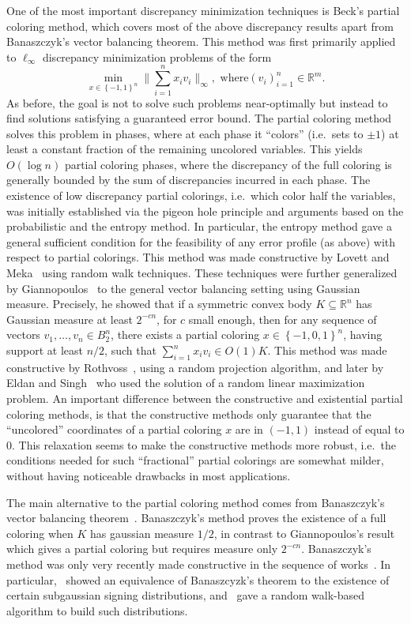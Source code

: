 \documentclass[11pt]{article}
\newcommand{\R}{{\mathbb{R}}}
\newcommand{\set}[1]{\left\{ #1 \right\}}
\begin{document}
One of the most important discrepancy minimization techniques is Beck's
partial coloring method, which covers most of the above discrepancy results
apart from Banaszczyk's vector balancing theorem. This method was first
primarily applied to $\ell_\infty$ discrepancy minimization problems of the form
\[
\min_{x \in \set{-1,1}^n} \Big\|\sum_{i=1}^n x_i v_i\Big\|_\infty, \text{ where
} (v_i)_{i=1}^n \in \R^m.
\]
As before, the goal is not to solve such problems near-optimally but
instead to find solutions satisfying a guaranteed error bound. The
partial coloring method solves this problem in phases, where at each
phase it ``colors'' (i.e.~sets to $\pm 1$) at least a constant
fraction of the remaining uncolored variables.  This yields $O(\log
n)$ partial coloring phases, where the discrepancy of the full
coloring is generally bounded by the sum of discrepancies incurred in
each phase. The existence of low discrepancy partial colorings,
i.e.~which color half the variables, was initially established via the
pigeon hole principle and arguments based on the probabilistic and the
entropy method. In particular, the entropy method gave a general
sufficient condition for the feasibility of any error profile (as
above) with respect to partial colorings. This method was made
constructive by Lovett and Meka~\cite{lovettmeka} using random walk
techniques. These techniques  were further generalized by
Giannopoulos~\cite{giann} to the general vector balancing setting
using Gaussian measure. Precisely, he showed that if a symmetric
convex body $K \subseteq \R^n$ has Gaussian measure at least $2^{-c
  n}$, for $c$ small enough, then for any sequence of vectors
$v_1,\dots,v_n \in B_2^n$, there exists a partial coloring $x \in
\set{-1,0,1}^n$, having support at least $n/2$, such that
$\sum_{i=1}^n x_i v_i \in O(1) K$. This method was made constructive
by Rothvoss~\cite{rothvoss-giann}, using a random projection
algorithm, and later by Eldan and Singh~\cite{ES14} who used the
solution of a random linear maximization problem. An important
difference between the constructive and existential partial coloring
methods, is that the constructive methods only guarantee that the
``uncolored'' coordinates of a partial coloring $x$ are in $(-1,1)$
instead of equal to $0$. This relaxation seems to make the
constructive methods more robust, i.e.~the conditions needed for such
``fractional'' partial colorings are somewhat milder, without having
noticeable drawbacks in most applications.

The main alternative to the partial coloring method comes from Banaszczyk's
vector balancing theorem~\cite{bana}. 
 Banaszczyk's method proves the existence of a full coloring when
$K$ has gaussian measure $1/2$, in contrast to Giannopoulos's result
which gives a partial coloring but requires measure only $2^{-cn}$.
Banaszczyk's method was only very recently made constructive in
the sequence of works~\cite{BDG16,DGLN16,BDGL18}. In particular,~\cite{DGLN16}
showed an equivalence of Banaszcyzk's theorem to the existence of certain
subgaussian signing distributions, and~\cite{BDGL18} gave a random walk-based
algorithm to build such distributions.
\end{document}

